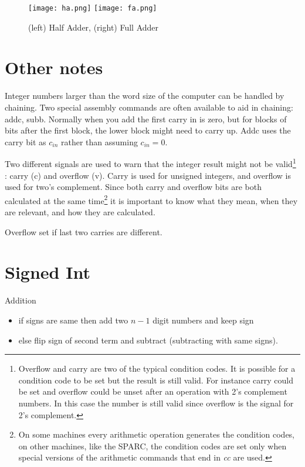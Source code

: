 \begin{figure}
\caption{(left) Half Adder, (right) Full Adder}\label{f-half_full_add}
\begin{center}
\texttt{[image: ha.png]} \hspace{.2in} \texttt{[image: fa.png]}
\end{center}
\end{figure}

\section{Other notes}

Integer numbers larger than the word size of the computer can be handled by chaining.  Two special assembly commands are often available to aid in chaining: addc, subb.   Normally when you add the first carry in is zero, but for blocks of bits after the first block, the lower block might need to carry up.  Addc uses the carry bit as $c_{in}$ rather than assuming $c_{in}=0$.

Two different signals are used to warn that the integer result might not be valid\footnote{Overflow and carry are two of the typical condition codes.  It is possible for a condition code to be set but the result is still valid.  For instance carry could be set and overflow could be unset after an operation with 2's complement numbers.  In this case the number is still valid since overflow is the signal for 2's complement.} : carry (c) and overflow (v).  Carry is used for unsigned integers, and overflow is used for two's complement.  Since both carry and overflow bits are both calculated at the same time\footnote{On some machines every arithmetic operation generates the condition codes, on other machines, like the SPARC, the condition codes are set only when special versions of the arithmetic commands that end in \emph{cc} are used.} it is important to know what they mean, when they are relevant, and how they are calculated.

Overflow set if last two carries are different.



\section{Signed Int}

Addition
\begin{itemize}
    \item if signs are same then add two $n-1$ digit numbers and keep sign
    \item else flip sign of second term and subtract (subtracting with same signs).
\end{itemize}

